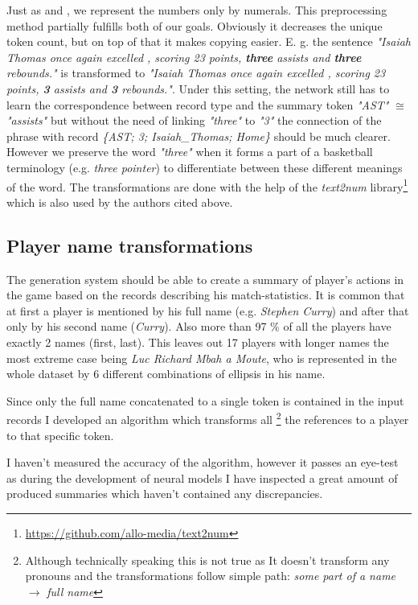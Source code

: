 Just as \citep{wiseman2017} and \citep{puduppully2019datatotext}, we represent the numbers only by numerals. This preprocessing method partially fulfills both of our goals. Obviously it decreases the unique token count, but on top of that it makes copying easier. E. g. the sentence \emph{"Isaiah Thomas once again excelled , scoring 23 points, \textbf{three} assists and \textbf{three} rebounds."} is transformed to \emph{"Isaiah Thomas once again excelled , scoring 23 points, \textbf{3} assists and \textbf{3} rebounds."}. Under this setting, the network still has to learn the correspondence between record type and the summary token \emph{"AST"} $\cong$ \emph{"assists"} but without the need of linking \emph{"three"} to \emph{"3"} the connection of the phrase with record \emph{\{AST; 3; Isaiah\_Thomas; Home\}} should be much clearer. However we preserve the word \emph{"three"} when it forms a part of a basketball terminology (e.g. \emph{three pointer}) to differentiate between these different meanings of the word. The transformations are done with the help of the \emph{text2num} library\footnote{\url{https://github.com/allo-media/text2num}} which is also used by the authors cited above.

\subsection{Player name transformations} \label{player_nm_trans_summary}

The generation system should be able to create a summary of player's actions in the game based on the records describing his match-statistics. It is common that at first a player is mentioned by his full name (e.g. \emph{Stephen Curry}) and after that only by his second name (\emph{Curry}). Also more than 97 \% of all the players have exactly 2 names (first, last). This leaves out 17 players with longer names the most extreme case being \emph{Luc Richard Mbah a Moute}, who is represented in the whole dataset by 6 different combinations of ellipsis in his name.

Since only the full name concatenated to a single token is contained in the input records I developed an algorithm which transforms all \footnote{Although technically speaking this is not true as It doesn't transform any pronouns and the transformations follow simple path: \emph{some part of a name} $\rightarrow$ \emph{full name}} the references to a player to that specific token.

I haven't measured the accuracy of the algorithm, however it passes an eye-test as during the development of neural models I have inspected a great amount of produced summaries which haven't contained any discrepancies.

